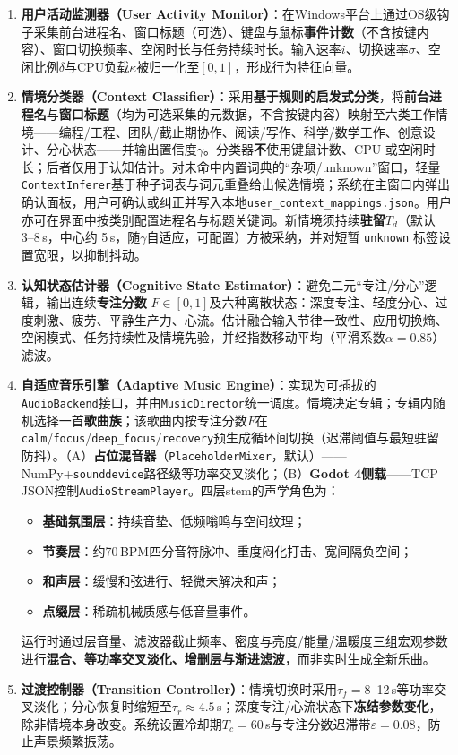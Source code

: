 \documentclass[12pt, fontset=windows]{ctexart}
\begin{document}
\begin{enumerate}
\item \textbf{用户活动监测器（User Activity Monitor）}：在Windows平台上通过OS级钩子采集前台进程名、窗口标题（可选）、键盘与鼠标\textbf{事件计数}（不含按键内容）、窗口切换频率、空闲时长与任务持续时长。输入速率$i$、切换速率$\sigma$、空闲比例$\delta$与CPU负载$\kappa$被归一化至$[0,1]$，形成行为特征向量。
\item \textbf{情境分类器（Context Classifier）}：采用\textbf{基于规则的启发式分类}，将\textbf{前台进程名}与\textbf{窗口标题}（均为可选采集的元数据，不含按键内容）映射至六类工作情境——编程/工程、团队/截止期协作、阅读/写作、科学/数学工作、创意设计、分心状态——并输出置信度$\gamma$。分类器\textbf{不}使用键鼠计数、CPU 或空闲时长；后者仅用于认知估计。对未命中内置词典的“杂项/unknown”窗口，轻量\texttt{ContextInferer}基于种子词表与词元重叠给出候选情境；系统在主窗口内弹出确认面板，用户可确认或纠正并写入本地\texttt{user\_context\_mappings.json}。用户亦可在界面中按类别配置进程名与标题关键词。新情境须持续\textbf{驻留$T_d$}（默认 3--8\,s，中心约 5\,s，随$\gamma$自适应，可配置）方被采纳，并对短暂 \texttt{unknown} 标签设置宽限，以抑制抖动。
\item \textbf{认知状态估计器（Cognitive State Estimator）}：避免二元“专注/分心”逻辑，输出连续\textbf{专注分数} $F\in[0,1]$及六种离散状态：深度专注、轻度分心、过度刺激、疲劳、平静生产力、心流。估计融合输入节律一致性、应用切换熵、空闲模式、任务持续性及情境先验，并经指数移动平均（平滑系数$\alpha=0.85$）滤波。
\item \textbf{自适应音乐引擎（Adaptive Music Engine）}：实现为可插拔的\texttt{AudioBackend}接口，并由\texttt{MusicDirector}统一调度。情境决定专辑；专辑内随机选择一首\textbf{歌曲族}；该歌曲内按专注分数$F$在\texttt{calm}/\texttt{focus}/\texttt{deep\_focus}/\texttt{recovery}预生成循环间切换（迟滞阈值与最短驻留防抖）。（A）\textbf{占位混音器}（\texttt{PlaceholderMixer}，默认）——NumPy+\texttt{sounddevice}路径级等功率交叉淡化；（B）\textbf{Godot 4侧载}——TCP JSON控制\texttt{AudioStreamPlayer}。四层stem的声学角色为：
\begin{itemize}
\item \textbf{基础氛围层}：持续音垫、低频嗡鸣与空间纹理；
\item \textbf{节奏层}：约70\,BPM四分音符脉冲、重度闷化打击、宽间隔负空间；
\item \textbf{和声层}：缓慢和弦进行、轻微未解决和声；
\item \textbf{点缀层}：稀疏机械质感与低音量事件。
\end{itemize}
运行时通过层音量、滤波器截止频率、密度与亮度/能量/温暖度三组宏观参数进行\textbf{混合、等功率交叉淡化、增删层与渐进滤波}，而非实时生成全新乐曲。
\item \textbf{过渡控制器（Transition Controller）}：情境切换时采用$\tau_f=8$--12\,s等功率交叉淡化；分心恢复时缩短至$\tau_r\approx4.5$\,s；深度专注/心流状态下\textbf{冻结参数变化}，除非情境本身改变。系统设置冷却期$T_c=60$\,s与专注分数迟滞带$\varepsilon=0.08$，防止声景频繁振荡。
\end{enumerate}
\end{document}

